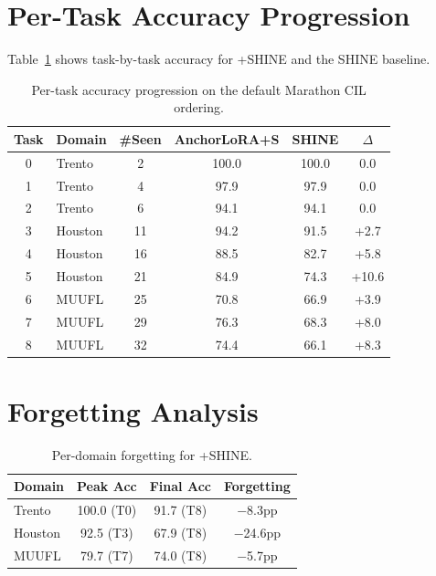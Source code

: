 \appendix

\section{Per-Task Accuracy Progression}
\label{app:pertask}

Table~\ref{tab:pertask} shows task-by-task accuracy for \methodname{}+SHINE and the SHINE baseline.

\begin{table}[h]
\centering
\caption{Per-task accuracy progression on the default Marathon CIL ordering.}
\label{tab:pertask}
\begin{tabular}{clcccc}
\toprule
Task & Domain & \#Seen & AnchorLoRA+S & SHINE & $\Delta$ \\
\midrule
0 & Trento & 2 & 100.0 & 100.0 & 0.0 \\
1 & Trento & 4 & 97.9 & 97.9 & 0.0 \\
2 & Trento & 6 & 94.1 & 94.1 & 0.0 \\
3 & Houston & 11 & 94.2 & 91.5 & +2.7 \\
4 & Houston & 16 & 88.5 & 82.7 & +5.8 \\
5 & Houston & 21 & 84.9 & 74.3 & +10.6 \\
6 & MUUFL & 25 & 70.8 & 66.9 & +3.9 \\
7 & MUUFL & 29 & 76.3 & 68.3 & +8.0 \\
8 & MUUFL & 32 & 74.4 & 66.1 & +8.3 \\
\bottomrule
\end{tabular}
\end{table}

\section{Forgetting Analysis}
\label{app:forgetting}

\begin{table}[h]
\centering
\caption{Per-domain forgetting for \methodname{}+SHINE.}
\label{tab:forgetting}
\begin{tabular}{lccc}
\toprule
Domain & Peak Acc & Final Acc & Forgetting \\
\midrule
Trento & 100.0 (T0) & 91.7 (T8) & $-$8.3pp \\
Houston & 92.5 (T3) & 67.9 (T8) & $-$24.6pp \\
MUUFL & 79.7 (T7) & 74.0 (T8) & $-$5.7pp \\
\bottomrule
\end{tabular}
\end{table}

